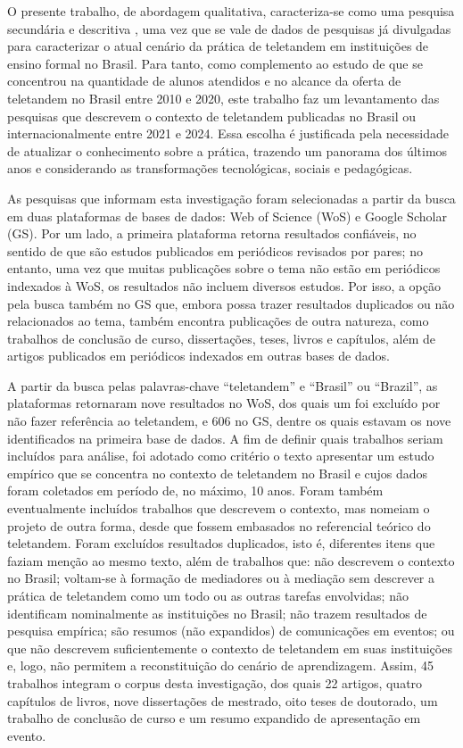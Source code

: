 \documentclass[portuguese]{textolivre}
\begin{document}
O presente trabalho, de abordagem qualitativa, caracteriza-se como uma pesquisa secundária e descritiva \cite{paiva2019}, uma vez que se vale de dados de pesquisas já divulgadas para caracterizar o atual cenário da prática de teletandem em instituições de ensino formal no Brasil. Para tanto, como complemento ao estudo de \textcite{aranha2021} que se concentrou na quantidade de alunos atendidos e no alcance da oferta de teletandem no Brasil entre 2010 e 2020, este trabalho faz um levantamento das pesquisas que descrevem o contexto de teletandem publicadas no Brasil ou internacionalmente entre 2021 e 2024. Essa escolha é justificada pela necessidade de atualizar o conhecimento sobre a prática, trazendo um panorama dos últimos anos e considerando as transformações tecnológicas, sociais e pedagógicas.

As pesquisas que informam esta investigação foram selecionadas a partir da busca em duas plataformas de bases de dados: Web of Science (WoS) e Google Scholar (GS). Por um lado, a primeira plataforma retorna resultados confiáveis, no sentido de que são estudos publicados em periódicos revisados por pares; no entanto, uma vez que muitas publicações sobre o tema não estão em periódicos indexados à WoS, os resultados não incluem diversos estudos. Por isso, a opção pela busca também no GS que, embora possa trazer resultados duplicados ou não relacionados ao tema, também encontra publicações de outra natureza, como trabalhos de conclusão de curso, dissertações, teses, livros e capítulos, além de artigos publicados em periódicos indexados em outras bases de dados.

A partir da busca pelas palavras-chave “teletandem” e “Brasil” ou “Brazil”, as plataformas retornaram nove resultados no WoS, dos quais um foi excluído por não fazer referência ao teletandem, e 606 no GS, dentre os quais estavam os nove identificados na primeira base de dados. A fim de definir quais trabalhos seriam incluídos para análise, foi adotado como critério o texto apresentar um estudo empírico que se concentra no contexto de teletandem no Brasil e cujos dados foram coletados em período de, no máximo, 10 anos. Foram também eventualmente incluídos trabalhos que descrevem o contexto, mas nomeiam o projeto de outra forma, desde que fossem embasados no referencial teórico do teletandem. Foram excluídos resultados duplicados, isto é, diferentes itens que faziam menção ao mesmo texto, além de trabalhos que: não descrevem o contexto no Brasil; voltam-se à formação de mediadores ou à mediação sem des\-crever a prática de teletandem como um todo ou as outras tarefas envolvidas; não identificam nominalmente as instituições no Brasil; não trazem resultados de pesquisa empírica; são resumos (não expandidos) de comunicações em eventos; ou que não descrevem suficientemente o contexto de teletandem em suas instituições e, logo, não permitem a reconstituição do cenário de aprendizagem. Assim, 45 trabalhos integram o corpus desta investigação, dos quais 22 artigos, quatro capítulos de livros, nove dissertações de mestrado, oito teses de doutorado, um trabalho de conclusão de curso e um resumo expandido de apresentação em evento.
\end{document}
